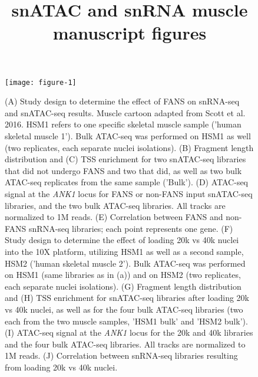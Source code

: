 \documentclass{article}
\title{snATAC and snRNA muscle manuscript figures}
\begin{document}

\maketitle
\pagestyle{empty}

  
\renewcommand{\thefigure}{\textbf{\arabic{figure}. }}
\setcounter{figure}{0}

\begin{figure}
\texttt{[image: figure-1]}
	\caption{(A) Study design to determine the effect of FANS on snRNA-seq and snATAC-seq results. Muscle cartoon adapted from Scott et al. 2016. HSM1 refers to one specific skeletal muscle sample ('human skeletal muscle 1'). Bulk ATAC-seq was performed on HSM1 as well (two replicates, each separate nuclei isolations). (B) Fragment length distribution and (C) TSS enrichment for two snATAC-seq libraries that did not undergo FANS and two that did, as well as two bulk ATAC-seq replicates from the same sample ('Bulk'). (D) ATAC-seq signal at the \textit{ANK1} locus for FANS or non-FANS input snATAC-seq libraries, and the two bulk ATAC-seq libraries. All tracks are normalized to 1M reads. (E) Correlation between FANS and non-FANS snRNA-seq libraries; each point represents one gene. (F) Study design to determine the effect of loading 20k vs 40k nuclei into the 10X platform, utilizing HSM1 as well as a second sample, HSM2 ('human skeletal muscle 2'). Bulk ATAC-seq was performed on HSM1 (same libraries as in (a)) and on HSM2 (two replicates, each separate nuclei isolations). (G) Fragment length distribution and (H) TSS enrichment for snATAC-seq libraries after loading 20k vs 40k nuclei, as well as for the four bulk ATAC-seq libraries (two each from the two muscle samples, 'HSM1 bulk' and 'HSM2 bulk'). (I) ATAC-seq signal at the \textit{ANK1} locus for the 20k and 40k libraries and the four bulk ATAC-seq libraries. All tracks are normalized to 1M reads. (J) Correlation between snRNA-seq libraries resulting from loading 20k vs 40k nuclei.}
\end{figure}
\end{document}
